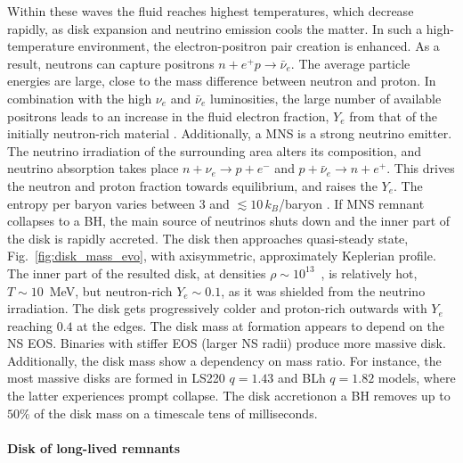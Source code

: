 Within these waves the fluid reaches highest temperatures, which decrease rapidly, as 
disk expansion and neutrino emission cools the matter. 
In such a high-temperature environment, the electron-positron pair creation is enhanced.
As a result, neutrons can capture positrons $n+e^+p\rightarrow\bar{\nu}_e$.
The average particle energies are large, close to the mass difference between neutron 
and proton. 
In combination with the high $\nu_e$ and $\bar{\nu}_e$ luminosities,
the large number of available positrons leads to an increase 
in the fluid electron fraction, $Y_e$ from that of the initially neutron-rich material
\citep{Qian:1996xt}.
Additionally, a \ac{MNS} is a strong neutrino emitter. The neutrino irradiation of the 
surrounding area alters its composition, and neutrino absorption takes place
$n+\nu_e\rightarrow p + e^{-}$ and $p + \bar{\nu}_e\rightarrow n + e^+$.
This drives the neutron and proton fraction towards equilibrium, and raises the $Y_e$.
The entropy per baryon varies between $3$ and $\lesssim 10\,$$k_{B}$/baryon \citep{Perego:2019adq}.
If \ac{MNS} remnant collapses to a BH, the main source of neutrinos shuts down and 
the inner part of the disk is rapidly accreted. 
The disk then approaches quasi-steady state, Fig.~\ref{fig:disk_mass_evo}, with 
axisymmetric, approximately Keplerian profile.
The inner part of the resulted disk, at densities $\rho\sim10^{13}$~\gcm, 
is relatively hot, $T\sim10\,$ MeV, but neutron-rich $Y_e\sim0.1$, as it was shielded 
from the neutrino irradiation. The disk gets progressively colder and proton-rich 
outwards with $Y_e$ reaching $0.4$ at the edges.
The disk mass at formation appears to depend on the \ac{NS} \ac{EOS}. Binaries with 
stiffer EOS (larger \ac{NS} radii) produce more massive disk.
Additionally, the disk mass show a dependency on mass ratio. For instance, the most massive disks are formed in LS220 $q=1.43$ and  BLh $q=1.82$ models, where the latter experiences prompt collapse.
The disk accretionon a \ac{BH} removes up to $50\%$ of the disk mass on a timescale tens of milliseconds.


\paragraph{Disk of long-lived remnants}


